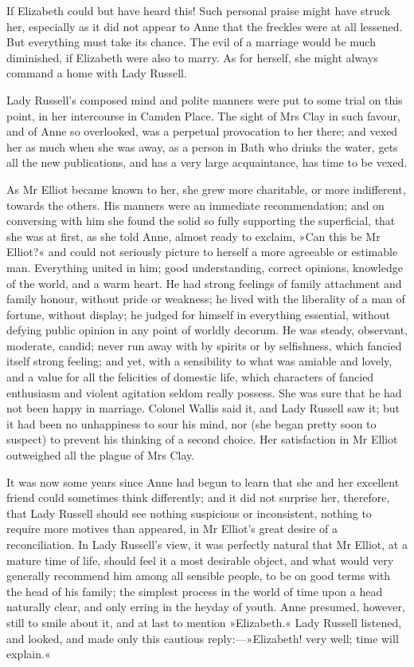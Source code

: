 If Elizabeth could but have heard this! Such personal praise might have struck her, especially as it did not appear to Anne that the freckles were at all lessened. But everything must take its chance. The evil of a marriage would be much diminished, if Elizabeth were also to marry. As for herself, she might always command a home with Lady Russell.

Lady Russell's composed mind and polite manners were put to some trial on this point, in her intercourse in Camden Place. The sight of Mrs Clay in such favour, and of Anne so overlooked, was a perpetual provocation to her there; and vexed her as much when she was away, as a person in Bath who drinks the water, gets all the new publications, and has a very large acquaintance, has time to be vexed.

As Mr Elliot became known to her, she grew more charitable, or more indifferent, towards the others. His manners were an immediate recommendation; and on conversing with him she found the solid so fully supporting the superficial, that she was at first, as she told Anne, almost ready to exclaim, »Can this be Mr Elliot?« and could not seriously picture to herself a more agreeable or estimable man. Everything united in him; good understanding, correct opinions, knowledge of the world, and a warm heart. He had strong feelings of family attachment and family honour, without pride or weakness; he lived with the liberality of a man of fortune, without display; he judged for himself in everything essential, without defying public opinion in any point of worldly decorum. He was steady, observant, moderate, candid; never run away with by spirits or by selfishness, which fancied itself strong feeling; and yet, with a sensibility to what was amiable and lovely, and a value for all the felicities of domestic life, which characters of fancied enthusiasm and violent agitation seldom really possess. She was sure that he had not been happy in marriage. Colonel Wallis said it, and Lady Russell saw it; but it had been no unhappiness to sour his mind, nor (she began pretty soon to suspect) to prevent his thinking of a second choice. Her satisfaction in Mr Elliot outweighed all the plague of Mrs Clay.

It was now some years since Anne had begun to learn that she and her excellent friend could sometimes think differently; and it did not surprise her, therefore, that Lady Russell should see nothing suspicious or inconsistent, nothing to require more motives than appeared, in Mr Elliot's great desire of a reconciliation. In Lady Russell's view, it was perfectly natural that Mr Elliot, at a mature time of life, should feel it a most desirable object, and what would very generally recommend him among all sensible people, to be on good terms with the head of his family; the simplest process in the world of time upon a head naturally clear, and only erring in the heyday of youth. Anne presumed, however, still to smile about it, and at last to mention »Elizabeth.« Lady Russell listened, and looked, and made only this cautious reply:—»Elizabeth! very well; time will explain.«

